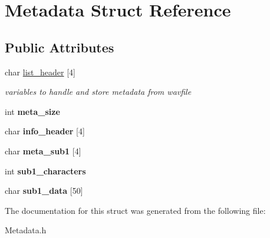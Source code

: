 \hypertarget{structMetadata}{}\section{Metadata Struct Reference}
\label{structMetadata}
\subsection*{Public Attributes}
\begin{DoxyCompactItemize}
\item 
\mbox{\label{structMetadata_a8a0b750f5d2646a43c921c57e0b5b4ee}} 
char \hyperlink{structMetadata_a8a0b750f5d2646a43c921c57e0b5b4ee}{list\+\_\+header} \mbox{[}4\mbox{]}
\begin{DoxyCompactList}\small\item\em variables to handle and store metadata from wavfile \end{DoxyCompactList}\item 
\mbox{\label{structMetadata_aca73d912f8b69dde9d86e01f761e08a9}} 
int {\bfseries meta\+\_\+size}
\item 
\mbox{\label{structMetadata_af29e8f0cd80beda835214bff1e7c0c5e}} 
char {\bfseries info\+\_\+header} \mbox{[}4\mbox{]}
\item 
\mbox{\label{structMetadata_a1be15a81799cbecaa1722a05cf4f90e1}} 
char {\bfseries meta\+\_\+sub1} \mbox{[}4\mbox{]}
\item 
\mbox{\label{structMetadata_a45e508bc52b3d4b1dcf442b7e4cbb6a4}} 
int {\bfseries sub1\+\_\+characters}
\item 
\mbox{\label{structMetadata_ac0fde020671818bb45f135d20540108c}} 
char {\bfseries sub1\+\_\+data} \mbox{[}50\mbox{]}
\end{DoxyCompactItemize}


The documentation for this struct was generated from the following file\+:\begin{DoxyCompactItemize}
\item 
Metadata.\+h\end{DoxyCompactItemize}
